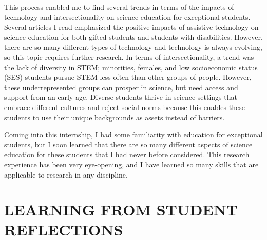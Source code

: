 \documentclass[11.5pt]{sig-alternate}
\begin{document}
\begin{large}
This process enabled me to find several trends in terms of the impacts of technology and intersectionality on science education for exceptional students. Several articles I read emphasized the positive impacts of assistive technology on science education for both gifted students and students with disabilities. However, there are so many different types of technology and technology is always evolving, so this topic requires further research. In terms of intersectionality, a trend was the lack of diversity in STEM; minorities, females, and low socioeconomic status (SES) students pursue STEM less often than other groups of people. However, these underrepresented groups can prosper in science, but need access and support from an early age. Diverse students thrive in science settings that embrace different cultures and reject social norms because this enables these students to use their unique backgrounds as assets instead of barriers.

Coming into this internship, I had some familiarity with education for exceptional students, but I soon learned that there are so many different aspects of science education for these students that I had never before considered. This research experience has been very eye-opening, and I have learned so many skills that are applicable to research in any discipline.

\section*{LEARNING FROM STUDENT REFLECTIONS}


\end{large}
\end{document}
